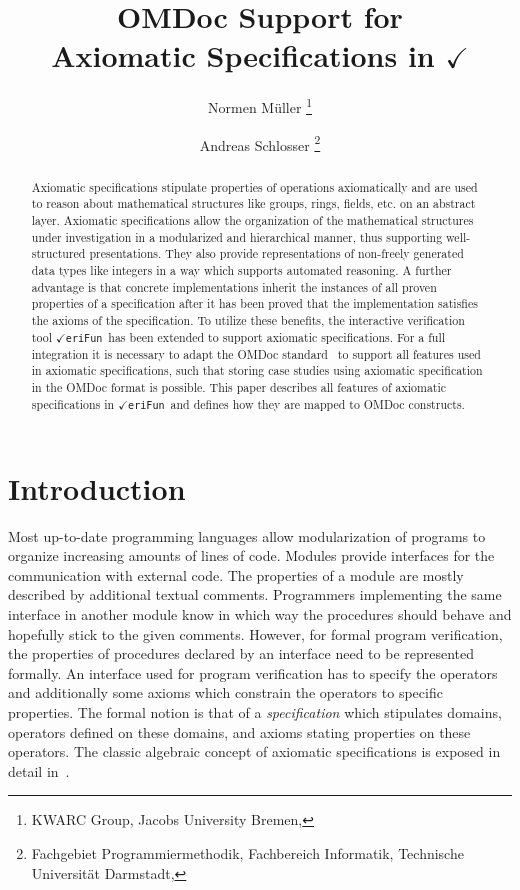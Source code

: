 \documentclass{article}
\theoremstyle{remark}
\theoremstyle{definition}
\newcommand{\VeriFun}{\mbox{{\Large $\checkmark $}\hspace{-0.21cm}\texttt{eriFun}}}
\newcommand{\titleVeriFun}{{\mbox{{\Huge $\checkmark $}\hspace{-0.37cm}{\Large \texttt{eriFun}}} }}
\begin{document}
\title{OMDoc Support for\\ Axiomatic Specifications in \titleVeriFun}

\author{Normen M\"uller
        \thanks{KWARC Group, Jacobs University Bremen, \homenormen}
        \and
        Andreas Schlosser
        \thanks{Fachgebiet Programmiermethodik, Fachbereich Informatik, Technische Universit\"at Darmstadt, \homeandreas}
        }


\maketitle

\begin{abstract}
\noindent Axiomatic specifications stipulate properties of operations axiomatically and are used to reason about
mathematical structures like groups, rings, fields, etc. on an abstract layer. Axiomatic specifications allow the
organization of the mathematical structures under investigation in a modularized and hierarchical manner, thus
supporting well-structured presentations.  They also provide representations of non-freely generated data types like
integers in a way which supports automated reasoning. A further advantage is that concrete implementations inherit the
instances of all proven properties of a specification after it has been proved that the implementation satisfies the
axioms of the specification. To utilize these benefits, the interactive verification tool \VeriFun\ has been extended
to support axiomatic specifications. For a full integration it is necessary to adapt the OMDoc standard~\cite{K:OMDoc}
to support all features used in axiomatic specifications, such that storing case studies using axiomatic specification
in the OMDoc format is possible. This paper describes all features of axiomatic specifications in \VeriFun\ and defines
how they are mapped to OMDoc constructs.
\end{abstract}

\section{Introduction} \label{sec:intro}
Most up-to-date programming languages allow modularization of programs to organize increasing amounts of lines of code.
Modules provide interfaces for the communication with external code. The properties of a module are mostly described by
additional textual comments. Programmers implementing the same interface in another module know in which way the
procedures should behave and hopefully stick to the given comments. However, for formal program verification, the
properties of procedures declared by an interface need to be represented formally. An interface used for program
verification has to specify the operators and additionally some axioms which constrain the operators to specific
properties. The formal notion is that of a \emph{specification} which stipulates domains, operators defined on these
domains, and axioms stating properties on these operators. The classic algebraic concept of axiomatic specifications is
exposed in detail in~\cite{EM:Spec1,EM:Spec2}.
\end{document}
